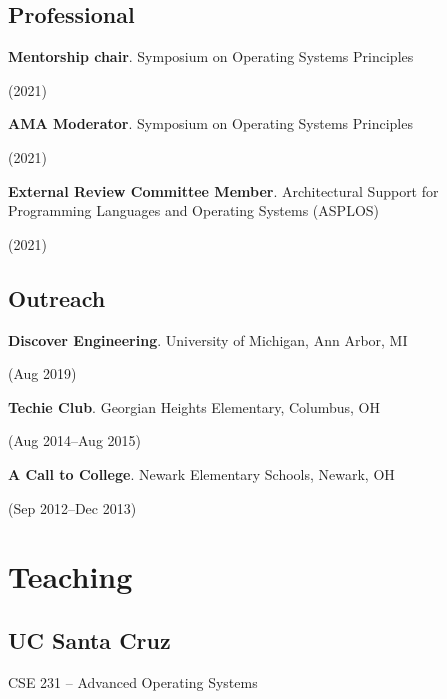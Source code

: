 \documentclass[letterpaper,10pt]{article}
\newcommand{\sidebyside}[2]{
  \begin{minipage}[t]{.75\textwidth}
    \raggedright{}
    #2
  \end{minipage}
  \hspace{.01\textwidth}
    \begin{minipage}[t]{.205\textwidth}
    \raggedleft
    #1
  \end{minipage}
}
\newcommand{\trio}[3]{\sidebyside{#3}{\textbf{#1}. #2}}
\begin{document}
\subsection{Professional}
\begin{smenumerate}
\item\trio{Mentorship chair}{Symposium on Operating Systems Principles}{(2021)}
\item\trio{AMA Moderator}{Symposium on Operating Systems Principles}{(2021)}
\item\trio{External Review Committee Member}{Architectural Support for
  Programming Languages and Operating Systems (ASPLOS)}{(2021)}
\end{smenumerate}

\subsection{Outreach}
\begin{smenumerate}
\item\trio{Discover Engineering}{University of Michigan, Ann Arbor, MI}{(Aug 2019)}
\item\trio{Techie Club}{Georgian Heights Elementary, Columbus, OH}{(Aug 2014--Aug 2015)}
\item\trio{A Call to College}{Newark Elementary Schools, Newark, OH}{(Sep 2012--Dec 2013)}
\end{smenumerate}



\section{Teaching}
\subsection{UC Santa Cruz}
\begin{smenumerate}
  \item CSE 231 -- Advanced Operating Systems
  
\end{smenumerate}
\end{document}
